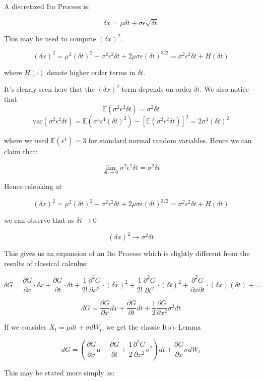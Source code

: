 \documentclass[11pt,]{article}
\begin{document}
A discretized Ito Process is:

\[\delta x = \mu \delta t+\sigma\epsilon \sqrt{\delta t}\]

This may be used to compute \((\delta x)^2\).

\[(\delta x)^2 = \mu^2(\delta t)^2 + \sigma^2 \epsilon^2\delta t+
2\mu\sigma\epsilon(\delta t)^{3/2}=\sigma^2\epsilon^2\delta t+H(\delta t)\]

where \(H(\cdot)\) denote higher order terms in \(\delta t\).

It's clearly seen here that the \((\delta x)^2\) term depends on order
\(\delta t\). We also notice that
\[\mathbb{E}(\sigma^2\epsilon^2\delta t) = \sigma^2\delta t\]
\[\text{var}(\sigma^2\epsilon^2\delta t) = \mathbb{E}(\sigma^4\epsilon^4(\delta t)^2)-
[\mathbb{E}(\sigma^2\epsilon^2\delta t)]^2 = 2\sigma^4(\delta t)^2\]

where we used \(\mathbb{E}(\epsilon^4) = 3\) for standard normal random
variables. Hence we can claim that:

\[\lim_{\delta t\to 0} \sigma^2\epsilon^2\delta t = \sigma^2\delta t\]

Hence relooking at

\[(\delta x)^2 = \mu^2(\delta t)^2 + \sigma^2 \epsilon^2\delta t+
2\mu\sigma\epsilon(\delta t)^{3/2}=\sigma^2\epsilon^2\delta t+H(\delta t)\]

we can observe that as \(\delta t\to 0\)

\[(\delta x)^2\to \sigma^2\delta t \]

This gives us an expansion of an Ito Process which is slightly different
from the results of classical calculus:

\[\delta G = \frac{\partial G}{\partial x}\cdot \delta x +
\frac{\partial G}{\partial t}\cdot \delta t + 
\frac{1}{2!}\frac{\partial^2 G}{\partial x^2}\cdot (\delta x)^2 +
\frac{1}{2!}\frac{\partial^2 G}{\partial t^2}\cdot (\delta t)^2 +
\frac{\partial^2 G}{\partial x \partial t}\cdot (\delta x)(\delta t) + \hdots
\]

\[dG = \frac{\partial G}{\partial x}dx +
\frac{\partial G}{\partial t} dt +
\frac{1}{2}\frac{\partial G}{\partial x^2} \sigma^2dt
\]

If we consider \(X_t = \mu dt + \sigma dW_t\), we get the classic Ito's
Lemma

\[dG = (\frac{\partial G}{\partial x}\mu + 
\frac{\partial G}{\partial t} + \frac{1}{2}\frac{\partial^2 G}{\partial x^2}\sigma^2)dt +
\frac{\partial G}{\partial x}\sigma dW_t\]

This may be stated more simply as:
\end{document}
